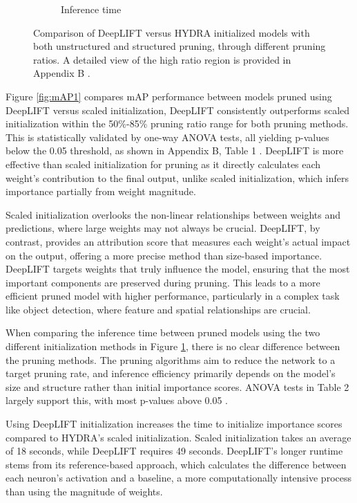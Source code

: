\documentclass[10pt]{cai}
\begin{document}
\begin{figure}
\begin{subfigure}[b]{.45\textwidth}
      \caption{Inference time}
      \label{fig:time1}
    \end{subfigure}
    \caption{Comparison of DeepLIFT versus HYDRA initialized models with both unstructured and structured pruning, through different pruning ratios. A detailed view of the high ratio region is provided in Appendix B  \cite{MyAppendix}.}
    \label{fig:result1}
\end{figure}

Figure \ref{fig:mAP1} compares mAP performance between models pruned using DeepLIFT versus scaled initialization, DeepLIFT consistently outperforms scaled initialization within the 50\%-85\% pruning ratio range for both pruning methods. This is statistically validated by one-way ANOVA tests, all yielding p-values below the 0.05 threshold, as shown in Appendix B, Table 1 \cite{MyAppendix}. DeepLIFT is more effective than scaled initialization for pruning as it directly calculates each weight's contribution to the final output, unlike scaled initialization, which infers importance partially from weight magnitude.

Scaled initialization overlooks the non-linear relationships between weights and predictions, where large weights may not always be crucial. DeepLIFT, by contrast, provides an attribution score that measures each weight's actual impact on the output, offering a more precise method than size-based importance. DeepLIFT targets weights that truly influence the model, ensuring that the most important components are preserved during pruning. This leads to a more efficient pruned model with higher performance, particularly in a complex task like object detection, where feature and spatial relationships are crucial.

When comparing the inference time between pruned models using the two different initialization methods in Figure \ref{fig:time1}, there is no clear difference between the pruning methods. The pruning algorithms aim to reduce the network to a target pruning rate, and inference efficiency primarily depends on the model’s size and structure rather than initial importance scores. ANOVA tests in Table 2 largely support this, with most p-values above 0.05 \cite{MyAppendix}. 

Using DeepLIFT initialization increases the time to initialize importance scores compared to HYDRA's scaled initialization. Scaled initialization takes an average of 18 seconds, while DeepLIFT requires 49 seconds. DeepLIFT's longer runtime stems from its reference-based approach, which calculates the difference between each neuron's activation and a baseline, a more computationally intensive process than using the magnitude of weights.
\end{document}
